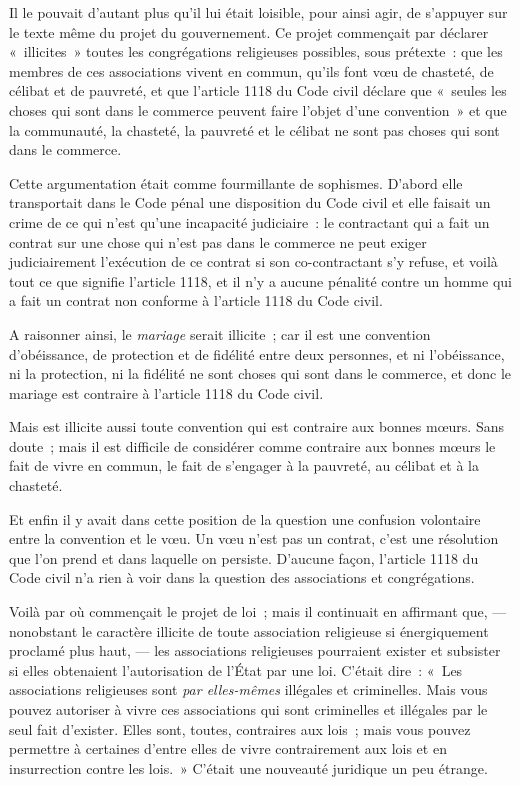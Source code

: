 \documentclass[french,twoside]{book} %
\begin{document}
Il le pouvait d’autant plus qu’il lui était loisible, pour ainsi agir, de s’appuyer sur le texte même du projet du gouvernement. Ce projet commençait par déclarer « illicites » toutes les congrégations religieuses possibles, sous prétexte : que les membres de ces associations vivent en commun, qu’ils font vœu de chasteté, de célibat et de pauvreté, et que l’article 1118 du Code civil déclare que « seules les choses qui sont dans le commerce peuvent faire l’objet d’une convention » et que la communauté, la chasteté, la pauvreté et le célibat ne sont pas choses qui sont dans le commerce.\par
Cette argumentation était comme fourmillante de sophismes. D’abord elle transportait dans le Code pénal une disposition du Code civil et elle faisait un crime de ce qui n’est qu’une incapacité judiciaire :  le contractant qui a fait un contrat sur une chose qui n’est pas dans le commerce ne peut exiger judiciairement l’exécution de ce contrat si son co-contractant s’y refuse, et voilà tout ce que signifie l’article 1118, et il n’y a aucune pénalité contre un homme qui a fait un contrat non conforme à l’article 1118 du Code civil.\par
A raisonner ainsi, le {\itshape mariage} serait illicite ; car il est une convention d’obéissance, de protection et de fidélité entre deux personnes, et ni l’obéissance, ni la protection, ni la fidélité ne sont choses qui sont dans le commerce, et donc le mariage est contraire à l’article 1118 du Code civil.\par
Mais est illicite aussi toute convention qui est contraire aux bonnes mœurs. Sans doute ; mais il est difficile de considérer comme contraire aux bonnes mœurs le fait de vivre en commun, le fait de s’engager à la pauvreté, au célibat et à la chasteté.\par
Et enfin il y avait dans cette position de la question une confusion volontaire entre la convention et le vœu. Un vœu n’est pas un contrat, c’est une résolution que l’on prend et dans laquelle on persiste. D’aucune façon, l’article 1118 du Code civil n’a rien à voir dans la question des associations et congrégations.\par
Voilà par où commençait le projet de loi ; mais  il continuait en affirmant que, — nonobstant le caractère illicite de toute association religieuse si énergiquement proclamé plus haut, — les associations religieuses pourraient exister et subsister si elles obtenaient l’autorisation de l’État par une loi. C’était dire : « Les associations religieuses sont {\itshape par elles-mêmes} illégales et criminelles. Mais vous pouvez autoriser à vivre ces associations qui sont criminelles et illégales par le seul fait d’exister. Elles sont, toutes, contraires aux lois ; mais vous pouvez permettre à certaines d’entre elles de vivre contrairement aux lois et en insurrection contre les lois. » C’était une nouveauté juridique un peu étrange.\par
\end{document}
